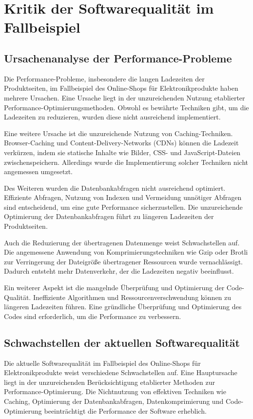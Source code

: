 \section{Kritik der Softwarequalität im Fallbeispiel}

\subsection{Ursachenanalyse der Performance-Probleme}
Die Performance-Probleme, insbesondere die langen Ladezeiten der Produktseiten, im Fallbeispiel des Online-Shops für Elektronikprodukte haben mehrere Ursachen. Eine Ursache liegt in der unzureichenden Nutzung etablierter Performance-Optimierungsmethoden. Obwohl es bewährte Techniken gibt, um die Ladezeiten zu reduzieren, wurden diese nicht ausreichend implementiert.

Eine weitere Ursache ist die unzureichende Nutzung von Caching-Techniken. Browser-Caching und Content-Delivery-Networks (CDNs) können die Ladezeit verkürzen, indem sie statische Inhalte wie Bilder, CSS- und JavaScript-Dateien zwischenspeichern. Allerdings wurde die Implementierung solcher Techniken nicht angemessen umgesetzt.

Des Weiteren wurden die Datenbankabfragen nicht ausreichend optimiert. Effiziente Abfragen, Nutzung von Indexen und Vermeidung unnötiger Abfragen sind entscheidend, um eine gute Performance sicherzustellen. Die unzureichende Optimierung der Datenbankabfragen führt zu längeren Ladezeiten der Produktseiten.

Auch die Reduzierung der übertragenen Datenmenge weist Schwachstellen auf. Die angemessene Anwendung von Komprimierungstechniken wie Gzip oder Brotli zur Verringerung der Dateigröße übertragener Ressourcen wurde vernachlässigt. Dadurch entsteht mehr Datenverkehr, der die Ladezeiten negativ beeinflusst.

Ein weiterer Aspekt ist die mangelnde Überprüfung und Optimierung der Code-Qualität. Ineffiziente Algorithmen und Ressourcenverschwendung können zu längeren Ladezeiten führen. Eine gründliche Überprüfung und Optimierung des Codes sind erforderlich, um die Performance zu verbessern.

\subsection{Schwachstellen der aktuellen Softwarequalität}
Die aktuelle Softwarequalität im Fallbeispiel des Online-Shops für Elektronikprodukte weist verschiedene Schwachstellen auf. Eine Hauptursache liegt in der unzureichenden Berücksichtigung etablierter Methoden zur Performance-Optimierung. Die Nichtnutzung von effektiven Techniken wie Caching, Optimierung der Datenbankabfragen, Datenkomprimierung und Code-Optimierung beeinträchtigt die Performance der Software erheblich.


